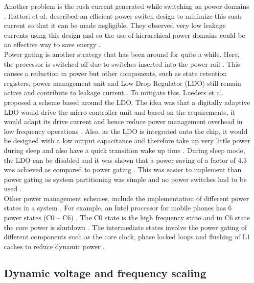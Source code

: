 \documentclass[journal]{IEEEtran}
\begin{document}
Another problem is the rush current generated while switching on power domains \cite{HierarchicalPower}. Hattori et al. \cite{HierarchicalPower} described an efficient power switch design to minimize this rush current so that it can be made negligible. They observed very low leakage currents using this design and so the use of hierarchical power domains could be an effective way to save energy \cite{HierarchicalPower}. \\

Power gating is another strategy that has been around for quite a while. Here, the processor is switched off due to switches inserted into the power rail \cite{LDO}. This causes a reduction in power but other components, such as state retention registers, power management unit and Low Drop Regulator (LDO) still remain active and contribute to leakage current \cite{LDO}. To mitigate this, Lueders et al. \cite{LDO} proposed a scheme based around the LDO. The idea was that a digitally adaptive LDO would drive the micro-controller unit and based on the requirements, it would adapt its drive current and hence reduce power management overhead in low frequency operations \cite{LDO}. Also, as the LDO is integrated onto the chip, it would be designed with a low output capacitance and therefore take up very little power during sleep and also have a quick transition wake up time \cite{LDO}. During sleep mode, the LDO can be disabled and it was shown that a power saving of a factor of 4.3 was achieved as compared to power gating \cite{LDO}. This was easier to implement than power gating as system partitioning was simple and no power switches had to be used \cite{LDO}. \\

Other power management schemes, include the implementation of different power states in a system \cite{Intel}. For example, an Intel processor for mobile phones has 6 power states (C0 – C6) \cite{Intel}. The C0 state is the high frequency state and in C6 state the core power is shutdown \cite{Intel}. The intermediate states involve the power gating of different components such as the core clock, phase locked loops and flushing of L1 caches to reduce dynamic power \cite{Intel}.   


\subsection{Dynamic voltage and frequency scaling}
\end{document}
